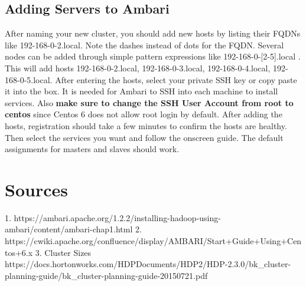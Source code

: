 \documentclass[9pt,twocolumn,twoside]{idsi}
\begin{document}
\subsection{Adding Servers to Ambari}
After naming your new cluster, you should add new hosts by listing their FQDNs like 192-168-0-2.local. Note the dashes instead of dots for the FQDN. Several nodes can be added through simple pattern expressions like 192-168-0-[2-5].local . This will add hosts 192-168-0-2.local, 192-168-0-3.local, 192-168-0-4.local, 192-168-0-5.local. After entering the hosts, select your private SSH key or copy paste it into the box. It is needed for Ambari to SSH into each machine to install services. Also \textbf{make sure to change the SSH User Account from root to centos} since Centos 6 does not allow root login by default. After adding the hosts, registration should take a few minutes to confirm the hosts are healthy. Then select the services you want and follow the onscreen guide. The default assignments for masters and slaves should work.



\section{Sources}
1. https://ambari.apache.org/1.2.2/installing-hadoop-using-ambari/content/ambari-chap1.html
2. https://cwiki.apache.org/confluence/display/AMBARI/Start+Guide+Using+Centos+6.x
3. Cluster Sizes https://docs.hortonworks.com/HDPDocuments/HDP2/HDP-2.3.0/bk_cluster-planning-guide/bk_cluster-planning-guide-20150721.pdf
\end{document}
